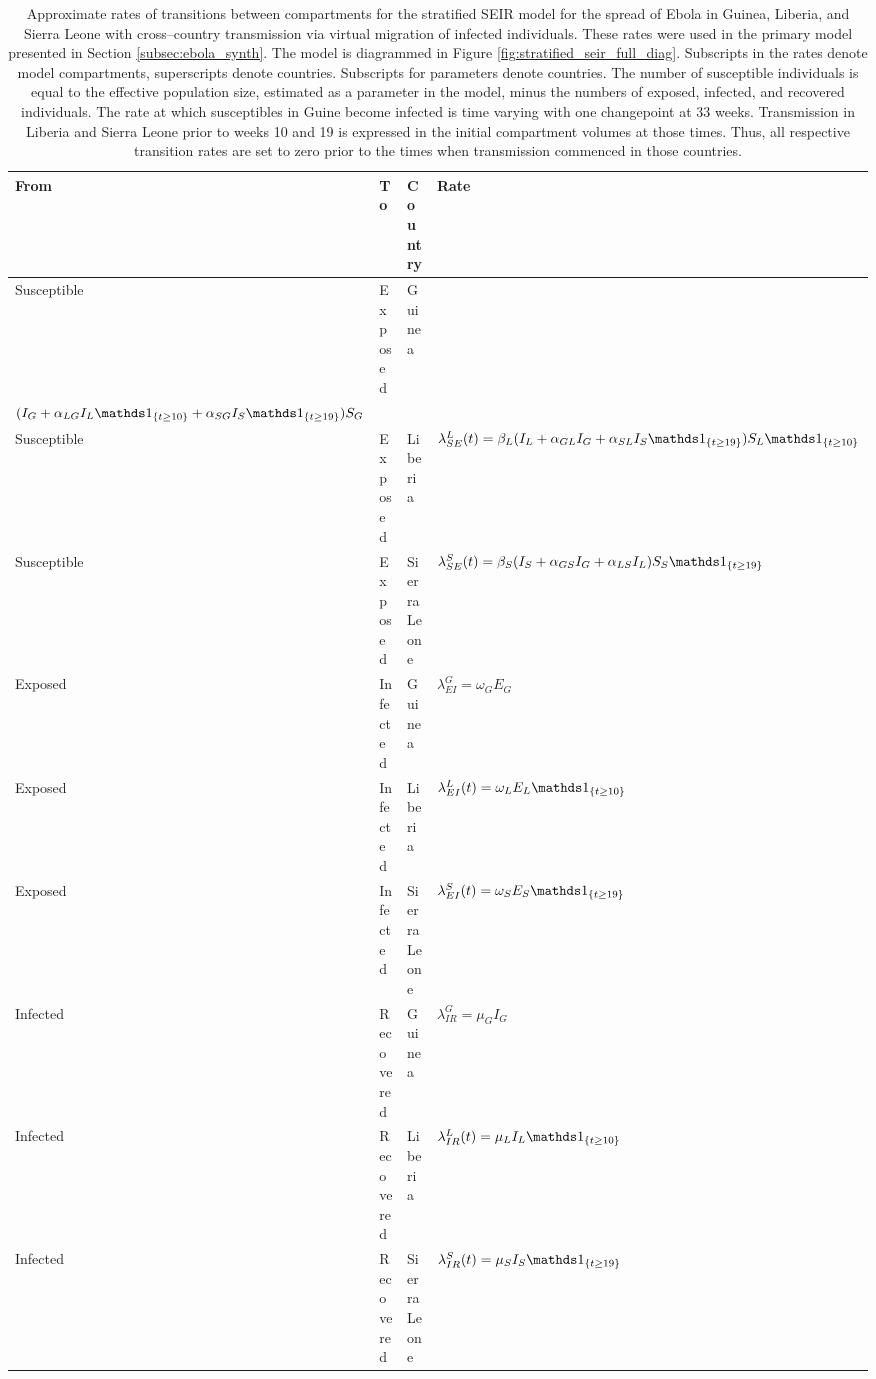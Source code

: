 \begin{table}[htbp]
	\caption[Transmission rates for the stratified SEIR model with virtual migration of infecteds for Ebola in West Africa.]{Approximate rates of transitions between compartments for the stratified SEIR model for the spread of Ebola in Guinea, Liberia, and Sierra Leone with cross--country transmission via virtual migration of infected individuals. These rates were used in the primary model presented in Section \ref{subsec:ebola_synth}. The model is diagrammed in Figure \ref{fig:stratified_seir_full_diag}. Subscripts in the rates denote model compartments, superscripts denote countries. Subscripts for parameters denote countries. The number of susceptible individuals is equal to the effective population size, estimated as a parameter in the model, minus the numbers of exposed, infected, and recovered individuals. The rate at which susceptibles in Guine become infected is time varying with one changepoint at 33 weeks. Transmission in Liberia and Sierra Leone prior to weeks 10 and 19 is expressed in the initial compartment volumes at those times. Thus, all respective transition rates are set to zero prior to the times when transmission commenced in those countries.}
	\label{tab:ebola_synth_rates_approx}
	\centering\footnotesize
	\begin{tabular}{llll}
		\hline
		\textbf{From} & \textbf{To} & \textbf{Country} & \textbf{Rate} \\
		\hline
		Susceptible & Exposed & Guinea & \hspace{-0.7in}\makecell{$ \lambda_{SE}^G(t) = (\beta_G^{(1)} \ind{t<33} + \beta_G^{(2)}\ind{t\geq33})\times $\\
		\hspace{1.25in}$ (I_G + \alpha_{LG}I_L\ind{t\geq10} + \alpha_{SG}I_S\ind{t\geq19})S_G $}\\
		Susceptible & Exposed & Liberia & $ \lambda_{SE}^L(t) = \beta_L(I_L + \alpha_{GL}I_G + \alpha_{SL}I_S\ind{t\geq19})S_L\ind{t\geq10} $\\
		Susceptible & Exposed & Sierra Leone & $ \lambda_{SE}^S(t) = \beta_S(I_S + \alpha_{GS}I_G + \alpha_{LS}I_L)S_S \ind{t\geq19} $ \\
		Exposed & Infected & Guinea & $ \lambda_{EI}^G = \omega_GE_G $\\
		Exposed & Infected & Liberia & $ \lambda_{EI}^L(t) = \omega_LE_L \ind{t\geq10}$ \\
		Exposed & Infected & Sierra Leone & $\lambda_{EI}^S(t) = \omega_SE_S\ind{t\geq19}$ \\
		Infected & Recovered & Guinea & $ \lambda_{IR}^G = \mu_GI_G $ \\
		Infected & Recovered & Liberia & $ \lambda_{IR}^L(t) = \mu_LI_L\ind{t\geq10} $ \\	
		Infected & Recovered & Sierra Leone & $ \lambda_{IR}^S(t) = \mu_SI_S\ind{t\geq19} $ \\
		\hline
	\end{tabular}
\end{table}

